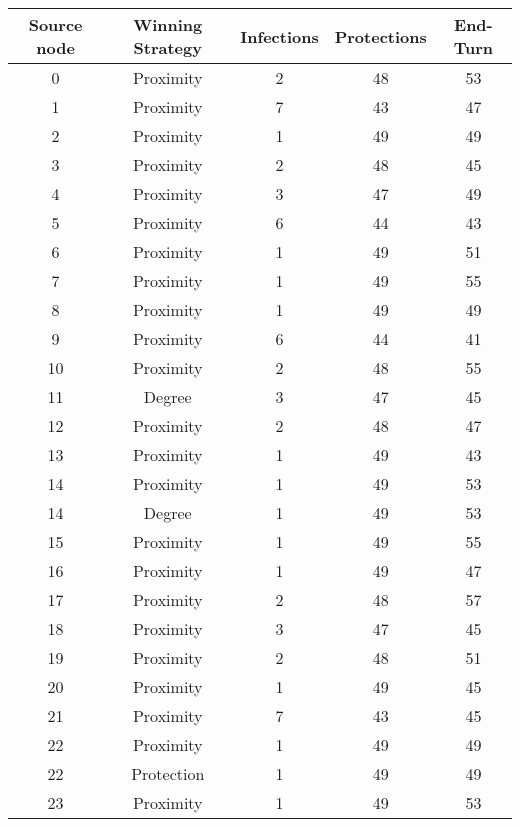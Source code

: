 \documentclass[results.tex]{subfiles}
\begin{document}
\begin{center}
  \begin{tabular}{| c || c | c | c | c |}
    \hline
    {\bfseries Source node} & {\bfseries Winning Strategy} & {\bfseries Infections} & {\bfseries Protections} & {\bfseries End-Turn} \\  %
    \hline\hline
    0 & Proximity & 2 & 48 & 53 \\ 
    \hline
    1 & Proximity & 7 & 43 & 47 \\ 
    \hline
    2 & Proximity & 1 & 49 & 49 \\ 
    \hline
    3 & Proximity & 2 & 48 & 45 \\ 
    \hline
    4 & Proximity & 3 & 47 & 49 \\ 
    \hline
    5 & Proximity & 6 & 44 & 43 \\ 
    \hline
    6 & Proximity & 1 & 49 & 51 \\ 
    \hline
    7 & Proximity & 1 & 49 & 55 \\ 
    \hline
    8 & Proximity & 1 & 49 & 49 \\ 
    \hline
    9 & Proximity & 6 & 44 & 41 \\ 
    \hline
    10 & Proximity & 2 & 48 & 55 \\ 
    \hline
    11 & Degree & 3 & 47 & 45 \\ 
    \hline
    12 & Proximity & 2 & 48 & 47 \\ 
    \hline
    13 & Proximity & 1 & 49 & 43 \\ 
    \hline
    14 & Proximity & 1 & 49 & 53 \\ 
    \hline
    14 & Degree & 1 & 49 & 53 \\ 
    \hline
    15 & Proximity & 1 & 49 & 55 \\ 
    \hline
    16 & Proximity & 1 & 49 & 47 \\ 
    \hline
    17 & Proximity & 2 & 48 & 57 \\ 
    \hline
    18 & Proximity & 3 & 47 & 45 \\ 
    \hline
    19 & Proximity & 2 & 48 & 51 \\ 
    \hline
    20 & Proximity & 1 & 49 & 45 \\ 
    \hline
    21 & Proximity & 7 & 43 & 45 \\ 
    \hline
    22 & Proximity & 1 & 49 & 49 \\ 
    \hline
    22 & Protection & 1 & 49 & 49 \\ 
    \hline
    23 & Proximity & 1 & 49 & 53 \\ 

\end{tabular}
\end{center}
\end{document}
